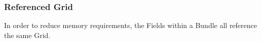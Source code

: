 

\subsubsection{Referenced Grid}
In order to reduce memory requirements, the Fields within a Bundle all 
reference the same Grid. 




